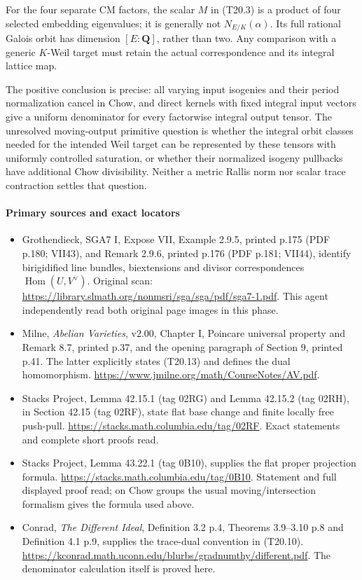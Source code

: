 \documentclass[11pt,a4paper]{article}
\providecommand{\tightlist}{\setlength{\itemsep}{0pt}\setlength{\parskip}{0pt}}
\theoremstyle{definition}
\begin{document}
For the four separate CM factors, the scalar \(M\) in (T20.3) is a product of four selected embedding eigenvalues; it is generally not \(N_{E/K}(\alpha)\). Its full rational Galois orbit has dimension \([E:\mathbf Q]\), rather than two. Any comparison with a generic \(K\)-Weil target must retain the actual correspondence and its integral lattice map.

The positive conclusion is precise: all varying input isogenies and their period normalization cancel in Chow, and direct kernels with fixed integral input vectors give a uniform denominator for every factorwise integral output tensor. The unresolved moving-output primitive question is whether the integral orbit classes needed for the intended Weil target can be represented by these tensors with uniformly controlled saturation, or whether their normalized isogeny pullbacks have additional Chow divisibility. Neither a metric Rallis norm nor scalar trace contraction settles that question.

\paragraph{Primary sources and exact locators}\label{primary-sources-and-exact-locators}

\begin{itemize}
\tightlist
\item
  Grothendieck, SGA7 I, Expose VII, Example 2.9.5, printed p.175 (PDF p.180; VII43), and Remark 2.9.6, printed p.176 (PDF p.181; VII44), identify birigidified line bundles, biextensions and divisor correspondences \(\operatorname{Hom}(U,V^\vee)\). Original scan: \url{https://library.slmath.org/nonmsri/sga/sga/pdf/sga7-1.pdf}. This agent independently read both original page images in this phase.
\item
  Milne, \emph{Abelian Varieties}, v2.00, Chapter I, Poincare universal property and Remark 8.7, printed p.37, and the opening paragraph of Section 9, printed p.41. The latter explicitly states (T20.13) and defines the dual homomorphism. \url{https://www.jmilne.org/math/CourseNotes/AV.pdf}.
\item
  Stacks Project, Lemma 42.15.1 (tag 02RG) and Lemma 42.15.2 (tag 02RH), in Section 42.15 (tag 02RF), state flat base change and finite locally free push-pull. \url{https://stacks.math.columbia.edu/tag/02RF}. Exact statements and complete short proofs read.
\item
  Stacks Project, Lemma 43.22.1 (tag 0B10), supplies the flat proper projection formula. \url{https://stacks.math.columbia.edu/tag/0B10}. Statement and full displayed proof read; on Chow groups the usual moving/intersection formalism gives the formula used above.
\item
  Conrad, \emph{The Different Ideal}, Definition 3.2 p.4, Theorems 3.9--3.10 p.8 and Definition 4.1 p.9, supplies the trace-dual convention in (T20.10). \url{https://kconrad.math.uconn.edu/blurbs/gradnumthy/different.pdf}. The denominator calculation itself is proved here.
\end{itemize}
\end{document}
